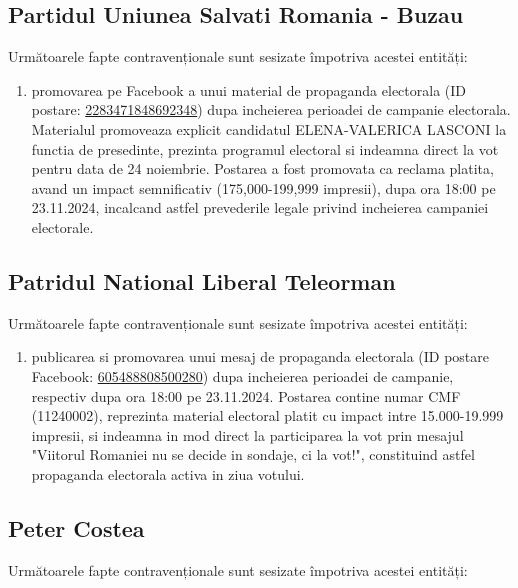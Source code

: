 \documentclass[a4paper,12pt]{article}
\begin{document}
\vspace{0.5cm}

\subsection{Partidul Uniunea Salvati Romania - Buzau}
Următoarele fapte contravenționale sunt sesizate împotriva acestei entități:

\begin{enumerate}[leftmargin=*, label=\arabic*.)]
    \item promovarea pe Facebook a unui material de propaganda electorala (ID postare: \href{https://www.facebook.com/ads/library/?id=2283471848692348}{2283471848692348}) dupa incheierea perioadei de campanie electorala. Materialul promoveaza explicit candidatul ELENA-VALERICA LASCONI la functia de presedinte, prezinta programul electoral si indeamna direct la vot pentru data de 24 noiembrie. Postarea a fost promovata ca reclama platita, avand un impact semnificativ (175,000-199,999 impresii), dupa ora 18:00 pe 23.11.2024, incalcand astfel prevederile legale privind incheierea campaniei electorale.
\end{enumerate}

\vspace{0.5cm}

\subsection{Patridul National Liberal Teleorman}
Următoarele fapte contravenționale sunt sesizate împotriva acestei entități:

\begin{enumerate}[leftmargin=*, label=\arabic*.)]
    \item publicarea si promovarea unui mesaj de propaganda electorala (ID postare Facebook: \href{https://www.facebook.com/ads/library/?id=605488808500280}{605488808500280}) dupa incheierea perioadei de campanie, respectiv dupa ora 18:00 pe 23.11.2024. Postarea contine numar CMF (11240002), reprezinta material electoral platit cu impact intre 15.000-19.999 impresii, si indeamna in mod direct la participarea la vot prin mesajul "Viitorul Romaniei nu se decide in sondaje, ci la vot!", constituind astfel propaganda electorala activa in ziua votului.
\end{enumerate}

\vspace{0.5cm}

\subsection{Peter Costea}
Următoarele fapte contravenționale sunt sesizate împotriva acestei entități:
\end{document}
